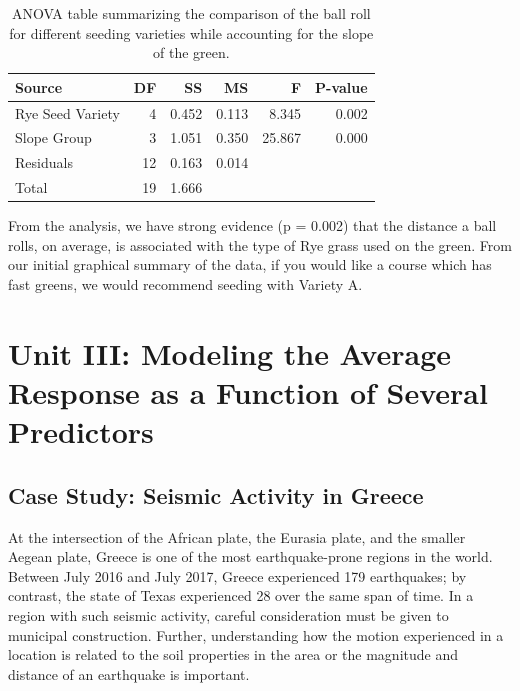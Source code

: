 \documentclass[]{book}
\theoremstyle{definition}
\theoremstyle{definition}
\theoremstyle{definition}
\theoremstyle{remark}
\begin{document}
\begin{table}

\caption{\label{tab:anovablocking-anova-table}ANOVA table summarizing the comparison of the ball roll for different seeding varieties while accounting for the slope of the green.}
\centering
\begin{tabular}[t]{l|r|r|r|r|r}
\hline
Source & DF & SS & MS & F & P-value\\
\hline
Rye Seed Variety & 4 & 0.452 & 0.113 & 8.345 & 0.002\\
\hline
Slope Group & 3 & 1.051 & 0.350 & 25.867 & 0.000\\
\hline
Residuals & 12 & 0.163 & 0.014 &  & \\
\hline
Total & 19 & 1.666 &  &  & \\
\hline
\end{tabular}
\end{table}

From the analysis, we have strong evidence (p = 0.002) that the distance
a ball rolls, on average, is associated with the type of Rye grass used
on the green. From our initial graphical summary of the data, if you
would like a course which has fast greens, we would recommend seeding
with Variety A.

\part{Unit III: Modeling the Average Response as a Function
of Several
Predictors}\label{part-unit-iii-modeling-the-average-response-as-a-function-of-several-predictors}

\hypertarget{CaseGreece}{\chapter{Case Study: Seismic Activity in
Greece}\label{CaseGreece}}

At the intersection of the African plate, the Eurasia plate, and the
smaller Aegean plate, Greece is one of the most earthquake-prone regions
in the world. Between July 2016 and July 2017, Greece experienced 179
earthquakes; by contrast, the state of Texas experienced 28 over the
same span of time. In a region with such seismic activity, careful
consideration must be given to municipal construction. Further,
understanding how the motion experienced in a location is related to the
soil properties in the area or the magnitude and distance of an
earthquake is important.
\end{document}
